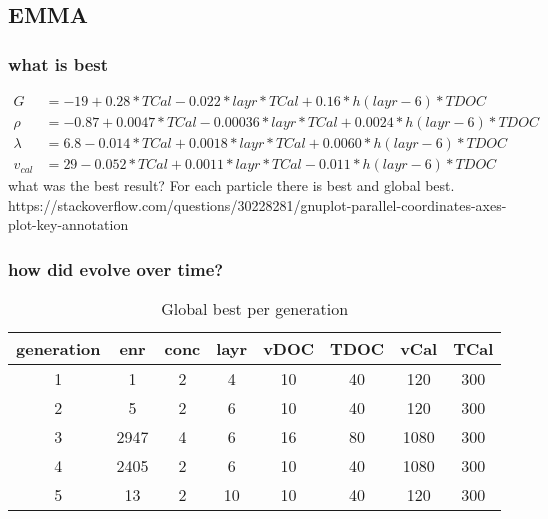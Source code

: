 \subsection{EMMA}
\subsubsection{what is best}
\begin{align}
    G &=      -19 + 0.28 * TCal  - 0.022 * layr*TCal  +  0.16 * h(layr-6)*TDOC \\
    \rho &=  -0.87 + 0.0047 * TCal  - 0.00036 * layr*TCal  +  0.0024 * h(layr-6)*TDOC \\
    \lambda &=  6.8 - 0.014 * TCal  + 0.0018 * layr*TCal  + 0.0060 * h(layr-6)*TDOC \\
    v_{cal} &= 29 - 0.052 * TCal  + 0.0011 * layr*TCal  -  0.011 * h(layr-6)*TDOC 
    \label{eq:emma}
\end{align}
what was the best result? For each particle there is best and global best. 
https://stackoverflow.com/questions/30228281/gnuplot-parallel-coordinates-axes-plot-key-annotation

\subsubsection{how did evolve over time?}

\begin{table}[h]
	\centering
    \caption{Global best per generation}
	\label{tab:emma_gen}
	\begin{tabular}{cccccccc}
        \hline\hline
    generation  &enr &conc &layr &vDOC &TDOC &vCal &TCal\\
        \hline
     1   &1       &2    &4   &10   &40  &120  &300\\
     2   &5       &2    &6   &10   &40  &120  &300\\
     3   &2947    &4    &6   &16   &80 &1080  &300\\
     4   &2405    &2    &6   &10   &40 &1080  &300\\
     5   &13      &2   &10   &10   &40  &120  &300\\
    \hline\hline
	\end{tabular}
\end{table}

